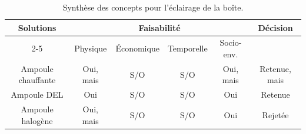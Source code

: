 \renewcommand{\arraystretch}{1.3}

\begin{table}[H]
  \centering
  \begin{tabular}{|c|c|c|c|c|c|}
    \hline
    \multirow{2}{*}{\textbf{Solutions}}
    & \multicolumn{4}{c|}{\textbf{Faisabilité}}
    & \multirow{2}{*}{\textbf{Décision}}
    \\ \cline{2-5}
    & Physique                                  & Économique & Temporelle & Socio-env. &               \\ \hline
    Ampoule chauffante & Oui, mais                                 & S/O        & S/O        & Oui, mais  & Retenue, mais \\ \hline
    Ampoule DEL        & Oui                                       & S/O        & S/O        & Oui        & Retenue       \\ \hline
    Ampoule halogène   & Oui, mais                                 & S/O        & S/O        & Oui        & Rejetée       \\ \hline
  \end{tabular}
  \caption{Synthèse des concepts pour l'éclairage de la boîte.}
  \label{tab:tableau-synthese-fonction-2}
\end{table}

